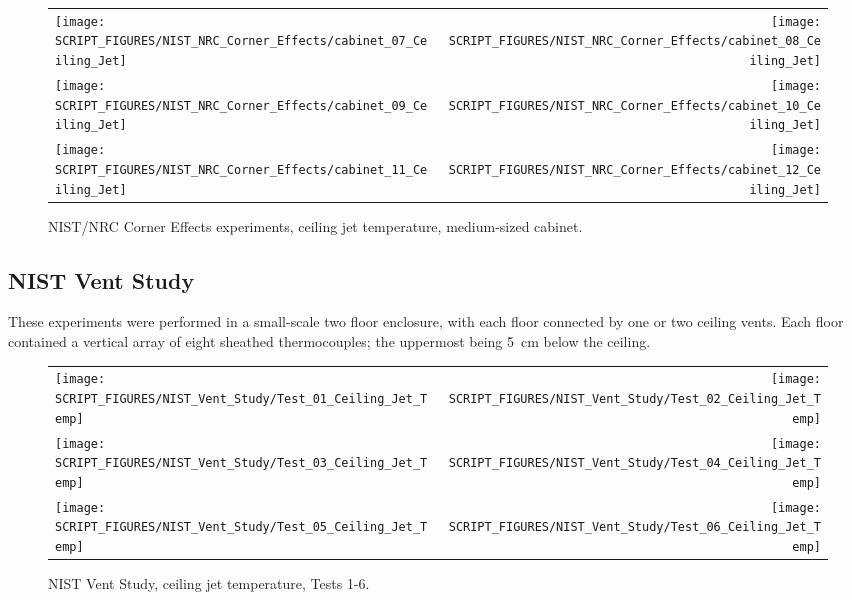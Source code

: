 \begin{figure}[p]
\begin{tabular*}{\textwidth}{l@{\extracolsep{\fill}}r}
\texttt{[image: SCRIPT\_FIGURES/NIST\_NRC\_Corner\_Effects/cabinet\_07\_Ceiling\_Jet]} &
\texttt{[image: SCRIPT\_FIGURES/NIST\_NRC\_Corner\_Effects/cabinet\_08\_Ceiling\_Jet]} \\
\texttt{[image: SCRIPT\_FIGURES/NIST\_NRC\_Corner\_Effects/cabinet\_09\_Ceiling\_Jet]} &
\texttt{[image: SCRIPT\_FIGURES/NIST\_NRC\_Corner\_Effects/cabinet\_10\_Ceiling\_Jet]} \\
\texttt{[image: SCRIPT\_FIGURES/NIST\_NRC\_Corner\_Effects/cabinet\_11\_Ceiling\_Jet]} &
\texttt{[image: SCRIPT\_FIGURES/NIST\_NRC\_Corner\_Effects/cabinet\_12\_Ceiling\_Jet]}
\end{tabular*}
\caption[NIST/NRC Corner Effects experiments, ceiling jet temperature, medium-sized cabinet]
{NIST/NRC Corner Effects experiments, ceiling jet temperature, medium-sized cabinet.}
\label{NIST_NRC_Corner_Ceiling_Jet_3}
\end{figure}


\clearpage

\subsection{NIST Vent Study}

These experiments were performed in a small-scale two floor enclosure, with each floor connected by one or two ceiling vents. Each floor contained a vertical array of eight sheathed thermocouples; the uppermost being 5~cm below the ceiling.

\begin{figure}[!h]
\begin{tabular*}{\textwidth}{l@{\extracolsep{\fill}}r}
\texttt{[image: SCRIPT\_FIGURES/NIST\_Vent\_Study/Test\_01\_Ceiling\_Jet\_Temp]} &
\texttt{[image: SCRIPT\_FIGURES/NIST\_Vent\_Study/Test\_02\_Ceiling\_Jet\_Temp]} \\
\texttt{[image: SCRIPT\_FIGURES/NIST\_Vent\_Study/Test\_03\_Ceiling\_Jet\_Temp]} &
\texttt{[image: SCRIPT\_FIGURES/NIST\_Vent\_Study/Test\_04\_Ceiling\_Jet\_Temp]} \\
\texttt{[image: SCRIPT\_FIGURES/NIST\_Vent\_Study/Test\_05\_Ceiling\_Jet\_Temp]} &
\texttt{[image: SCRIPT\_FIGURES/NIST\_Vent\_Study/Test\_06\_Ceiling\_Jet\_Temp]}
\end{tabular*}
\caption[NIST Vent Study, ceiling jet temperature, Tests 1-6]
{NIST Vent Study, ceiling jet temperature, Tests 1-6.}
\label{NIST_Vent_Study_Ceiling_Jet_1}
\end{figure}

